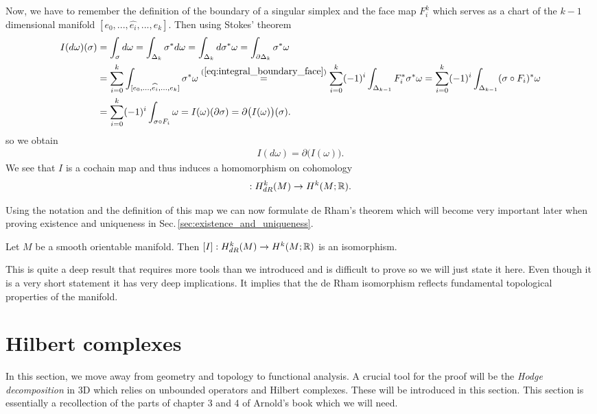 \documentclass[../master_thesis.tex]{subfiles}
\begin{document}
Now, 
we have to remember the definition of the boundary of a singular simplex 
and the face map $F^k_i$ which serves as a chart 
of the $k-1$ dimensional manifold $[e_0,...,\widehat{e_i}, ..., e_k]$. 
Then using Stokes' theorem 
\begin{align*}
    I(d\omega)(\sigma) &= \int_\sigma d\omega 
    = \int_{\Delta_k} \sigma^* d\omega 
    = \int_{\Delta_k} d\sigma^* \omega
    = \int_{\partial \Delta_k} \sigma^* \omega
    \\ &= \sum_{i=0}^k \int_{[e_0,...,\widehat{e_i}, ..., e_k]} \sigma^* \omega
    \stackrel{(\ref{eq:integral_boundary_face})}{=} \sum_{i=0}^{k} (-1)^i \int_{\Delta_{k-1}} F_i^*\sigma^* \omega
    = \sum_{i=0}^{k} (-1)^i \int_{\Delta_{k-1}} (\sigma\circ F_i)^* \omega
    \\ &= \sum_{i=0}^{k} (-1)^i \int_{\sigma\circ F_i} \omega
    = I(\omega)(\partial \sigma) = \partial \big(I(\omega)\big) (\sigma).
\end{align*}
so we obtain
\begin{align*}
    I(d\omega) = \partial \big(I(\omega)\big).
\end{align*}
We see that $I$ is a cochain map and thus 
induces a homomorphism on cohomology
\begin{align*}
    [I]:H^k_{dR}(M) \rightarrow H^k(M;\real).
\end{align*}

Using the notation and the definition of this map we can now formulate 
de Rham's theorem which will become very important later when proving
existence and uniqueness in Sec.\,\ref{sec:existence_and_uniqueness}.
\begin{theorem}\label{thm:de_rhams_theorem}
    Let $M$ be a smooth orientable manifold. Then $[I]: H^k_{dR}(M) \rightarrow H^k(M;\mathbb{R})$ is an isomorphism.
\end{theorem}
This is quite a deep result that requires more tools than we introduced and is
difficult to prove so we will just state it here. Even though it is a very short 
statement it has very deep implications. It implies that the de Rham isomorphism
reflects fundamental topological properties of the manifold.

\section{Hilbert complexes}\label{sec:hilbert_complexes}
In this section, we move away from geometry and topology to functional analysis.
A crucial tool for the proof will be the \textit{Hodge decomposition} 
in 3D which relies on unbounded operators and Hilbert complexes. These 
will be introduced in this section. This section is essentially a 
recollection of the parts of chapter 3 and 4 of Arnold's book \cite{arnold}
which we will need. 
\end{document}
